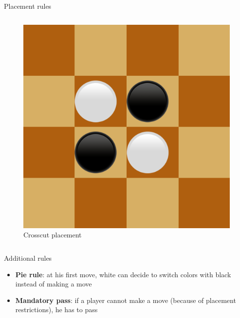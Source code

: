 \documentclass{beamer}
\begin{document}
\begin{frame}{Placement rules}
\begin{columns}
			\begin{figure}
				\includegraphics[scale=0.35]{images/crosscut.png}
				\caption*{Crosscut placement}
			\end{figure}
		
	\end{columns}
      \end{frame}
      
      \begin{frame}{Additional rules}
     \begin{itemize}
     \item \textbf{Pie rule}: at his first move, white can decide to switch colors with black instead of making a move
     \item \textbf{Mandatory pass}: if a player cannot make a move (because of placement restrictions), he has to pass
     \end{itemize}
      \end{frame}
      
      
\end{document}
